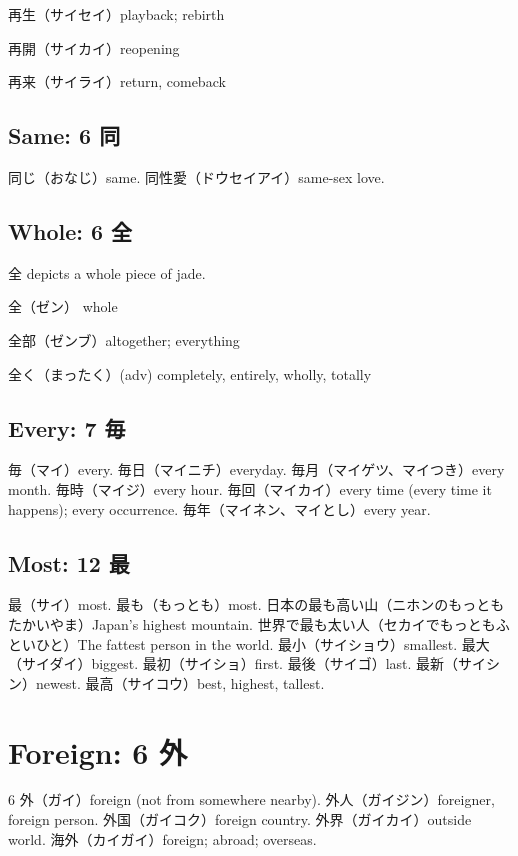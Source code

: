 再生（サイセイ）playback; rebirth

再開（サイカイ）reopening

再来（サイライ）return, comeback

\subsection{Same: 6 同}

同じ（おなじ）same.
同性愛（ドウセイアイ）same-sex love.

\subsection{Whole: 6 全}

全 depicts a whole piece of jade.

全（ゼン） whole

全部（ゼンブ）altogether; everything

全く（まったく）(adv) completely, entirely, wholly, totally

\subsection{Every: 7 毎}

毎（マイ）every.
毎日（マイニチ）everyday.
毎月（マイゲツ、マイつき）every month.
毎時（マイジ）every hour.
毎回（マイカイ）every time (every time it happens); every occurrence.
毎年（マイネン、マイとし）every year.

\subsection{Most: 12 最}

最（サイ）most.
最も（もっとも）most.
日本の最も高い山（ニホンのもっともたかいやま）Japan's highest mountain.
世界で最も太い人（セカイでもっともふといひと）The fattest person in the world.
最小（サイショウ）smallest.
最大（サイダイ）biggest.
最初（サイショ）first.
最後（サイゴ）last.
最新（サイシン）newest.
最高（サイコウ）best, highest, tallest.

\section{Foreign: 6 外}

6 外（ガイ）foreign (not from somewhere nearby).
外人（ガイジン）foreigner, foreign person.
外国（ガイコク）foreign country.
外界（ガイカイ）outside world.
海外（カイガイ）foreign; abroad; overseas.


